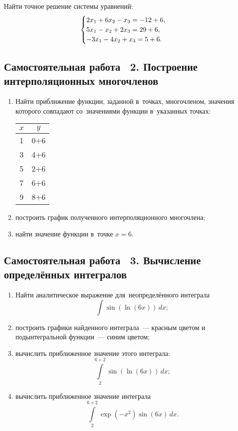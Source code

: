 \documentclass[10pt, a4paper, titlepage, oneside]{article}
\begin{document}
Найти точное решение системы уравнений:
\begin{equation*}
    \begin{cases}
        $$2x_1+6x_2-x_3 = -12+6$$, \\
        $$5x_1-x_2+2x_3 = 29+6$$, \\
        $$-3x_1-4x_2+x_3 = 5+6$$.
    \end{cases}
\end{equation*}

\subsection*{Самостоятельная работа \textnumero~2. Построение интерполяционных многочленов}

\begin{enumerate}
    \item Найти приближение функции, заданной в~точках, многочленом, значения которого совпадают со~значениями функции в~указанных точках:
    \begin{center}
    	\begin{tabular}{SC}
    		\toprule
    		
    		$x$ & $y$ \\
    		
    		\midrule
    		
    		1 & 0+6 \\
    		3 & 4+6 \\
    		5 & 2+6 \\
    		7 & 6+6 \\
    		9 & 8+6 \\
    		
    		\bottomrule
    	\end{tabular}
    \end{center}
    \item построить график полученного интерполяционного многочлена;
    \item найти значение функции в~точке $x=6$.
\end{enumerate}

\subsection*{Самостоятельная работа \textnumero~3. Вычисление определённых интегралов}

\begin{enumerate}
    \item Найти аналитическое выражение для~неопределённого интеграла $$\int \sin(\ln(6x))\,dx ;$$
    \item построить графики найденного интеграла~--- красным цветом и подынтегральной функции~--- синим цветом;
    \item вычислить приближенное значение этого интеграла: $$\int\limits_2^{6+2} \sin(\ln(6x))\,dx ;$$
    \item вычислить приближенное значение интеграла $$\int\limits_2^{6+2} \exp(-x^2)\sin(6x)\,dx .$$
\end{enumerate}
\end{document}
